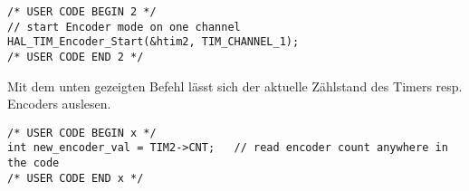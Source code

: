 \begin{lstlisting}[style=Cuvision, caption={Timer im Encoder Modus starten}]
/* USER CODE BEGIN 2 */
// start Encoder mode on one channel
HAL_TIM_Encoder_Start(&htim2, TIM_CHANNEL_1);
/* USER CODE END 2 */
\end{lstlisting}

Mit dem unten gezeigten Befehl lässt sich der aktuelle Zählstand des Timers resp. Encoders auslesen.\\

\begin{lstlisting}[style=Cuvision, caption={Encoderwert auslesen}]
/* USER CODE BEGIN x */
int new_encoder_val = TIM2->CNT;   // read encoder count anywhere in the code 
/* USER CODE END x */
\end{lstlisting}




